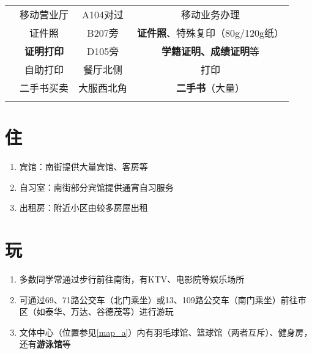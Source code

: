 \begin{table}[!ht]
\begin{tabular}{|c|c|c|c|}
        \cline{2-4}
                              & 移动营业厅              & A104对过 & 移动业务办理                       \\
        \Xhline{1.2pt}
        \multirow{4}{*}{其他}   & 证件照                & B207旁  & \textbf{证件照}、特殊复印（80g/120g纸） \\
        \cline{2-4}
                              & \textbf{证明打印}      & D105旁  & \textbf{学籍证明、成绩证明}等          \\
        \cline{2-4}
                              & 自助打印               & 餐厅北侧   & 打印                           \\
        \cline{2-4}
                              & 二手书买卖              & 大服西北角  & \textbf{二手书}（大量）             \\
        \Xhline{1.2pt}
    \end{tabular}
\end{table}

\section[住]{住}
\begin{enumerate}
    \item 宾馆：南街提供大量宾馆、客房等
    \item 自习室：南街部分宾馆提供通宵自习服务
    \item 出租房：附近小区由较多房屋出租\footnotemark
\end{enumerate}

\section[玩]{玩}
\begin{enumerate}
    \item 多数同学常通过步行前往南街，有KTV、电影院等娱乐场所
    \item 可通过69、71路公交车（北门乘坐）或13、109路公交车（南门乘坐）前往市区（如泰华、万达、谷德茂等）进行游玩
    \item 文体中心（位置参见\uline{\ref{map_a}}）内有羽毛球馆、篮球馆（两者互斥）、健身房，还有\textbf{游泳馆}等\footnotemark
\end{enumerate}